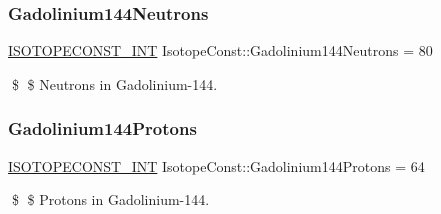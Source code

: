 \subsubsection{\texorpdfstring{Gadolinium144\+Neutrons}{Gadolinium144Neutrons}}
{\footnotesize\ttfamily \mbox{\hyperlink{group___isotope_const-_macros_ga5f18360b3e99483a35c32d789e62621c}{I\+S\+O\+T\+O\+P\+E\+C\+O\+N\+S\+T\+\_\+\+I\+NT}} Isotope\+Const\+::\+Gadolinium144\+Neutrons = 80}

\$ \$ Neutrons in Gadolinium-\/144. \mbox{\label{group___isotope_const-_gadolinium-_gd144_gaaec35b43541a41ca931fb54bec648e5e}} 
\subsubsection{\texorpdfstring{Gadolinium144\+Protons}{Gadolinium144Protons}}
{\footnotesize\ttfamily \mbox{\hyperlink{group___isotope_const-_macros_ga5f18360b3e99483a35c32d789e62621c}{I\+S\+O\+T\+O\+P\+E\+C\+O\+N\+S\+T\+\_\+\+I\+NT}} Isotope\+Const\+::\+Gadolinium144\+Protons = 64}

\$ \$ Protons in Gadolinium-\/144. 